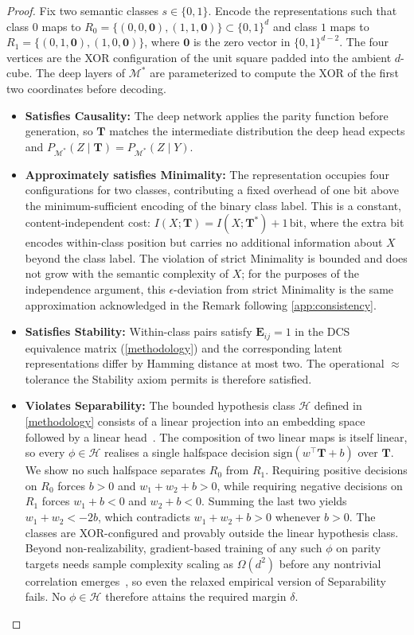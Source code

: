 \begin{proof}
Fix two semantic classes $s \in \{0, 1\}$. Encode the representations such that class $0$ maps to $R_0 = \{(0,0,\mathbf{0}), (1,1,\mathbf{0})\} \subset \{0,1\}^d$ and class $1$ maps to $R_1 = \{(0,1,\mathbf{0}), (1,0,\mathbf{0})\}$, where $\mathbf{0}$ is the zero vector in $\{0,1\}^{d-2}$. The four vertices are the XOR configuration of the unit square padded into the ambient $d$-cube. The deep layers of $\mathcal{M}^*$ are parameterized to compute the XOR of the first two coordinates before decoding.
\begin{itemize}
    \item \textbf{Satisfies Causality:} The deep network applies the parity function before generation, so $\mathbf{T}$ matches the intermediate distribution the deep head expects and $P_{\mathcal{M}^*}(Z \mid \mathbf{T}) = P_{\mathcal{M}^*}(Z \mid Y)$.
    \item \textbf{Approximately satisfies Minimality:} The representation occupies four configurations for two classes, contributing a fixed overhead of one bit above the minimum-sufficient encoding of the binary class label. This is a constant, content-independent cost: $I(X; \mathbf{T}) = I(X; \mathbf{T}^*) + 1\,\text{bit}$, where the extra bit encodes within-class position but carries no additional information about $X$ beyond the class label. The violation of strict Minimality is bounded and does not grow with the semantic complexity of $X$; for the purposes of the independence argument, this $\epsilon$-deviation from strict Minimality is the same approximation acknowledged in the Remark following \cref{app:consistency}.
    \item \textbf{Satisfies Stability:} Within-class pairs satisfy $\mathbf{E}_{ij} = 1$ in the DCS equivalence matrix (\cref{methodology}) and the corresponding latent representations differ by Hamming distance at most two. The operational $\approx$ tolerance the Stability axiom permits is therefore satisfied.
    \item \textbf{Violates Separability:} The bounded hypothesis class $\mathcal{H}$ defined in \cref{methodology} consists of a linear projection into an embedding space followed by a linear head~\citep{park2024linear}. The composition of two linear maps is itself linear, so every $\phi \in \mathcal{H}$ realises a single halfspace decision $\mathrm{sign}(w^\top \mathbf{T} + b)$ over $\mathbf{T}$. We show no such halfspace separates $R_0$ from $R_1$. Requiring positive decisions on $R_0$ forces $b > 0$ and $w_1 + w_2 + b > 0$, while requiring negative decisions on $R_1$ forces $w_1 + b < 0$ and $w_2 + b < 0$. Summing the last two yields $w_1 + w_2 < -2b$, which contradicts $w_1 + w_2 + b > 0$ whenever $b > 0$. The classes are XOR-configured and provably outside the linear hypothesis class. Beyond non-realizability, gradient-based training of any such $\phi$ on parity targets needs sample complexity scaling as $\Omega(d^2)$ before any nontrivial correlation emerges~\citep{barak2022hidden}, so even the relaxed empirical version of Separability fails. No $\phi \in \mathcal{H}$ therefore attains the required margin $\delta$.
\end{itemize}


\end{proof}
